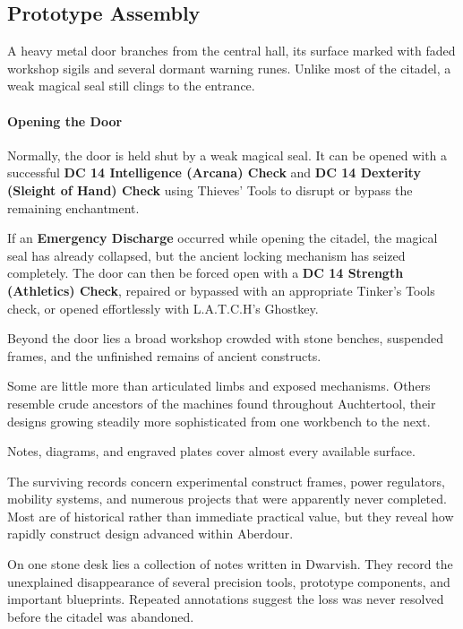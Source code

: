 \subsection*{ Prototype Assembly}
{\entryfont A heavy metal door branches from the central hall, its surface marked with faded workshop sigils and several dormant warning runes. Unlike most of the citadel, a weak magical seal still clings to the entrance.

\paragraph*{Opening the Door} Normally, the door is held shut by a weak magical seal. It can be opened with a successful \textbf{DC 14 Intelligence (Arcana) Check} and \textbf{DC 14 Dexterity (Sleight of Hand) Check} using Thieves' Tools to disrupt or bypass the remaining enchantment.

If an \textbf{Emergency Discharge} occurred while opening the citadel, the magical seal has already collapsed, but the ancient locking mechanism has seized completely. The door can then be forced open with a \textbf{DC 14 Strength (Athletics) Check}, repaired or bypassed with an appropriate Tinker's Tools check, or opened effortlessly with L.A.T.C.H's Ghostkey.}
\begin{DndReadAloud}
	Beyond the door lies a broad workshop crowded with stone benches, suspended frames, and the unfinished remains of ancient constructs.

Some are little more than articulated limbs and exposed mechanisms. Others resemble crude ancestors of the machines found throughout Auchtertool, their designs growing steadily more sophisticated from one workbench to the next.

Notes, diagrams, and engraved plates cover almost every available surface.
\end{DndReadAloud}
{\noindent\entryfont The surviving records concern experimental construct frames, power regulators, mobility systems, and numerous projects that were apparently never completed. Most are of historical rather than immediate practical value, but they reveal how rapidly construct design advanced within Aberdour.

On one stone desk lies a collection of notes written in Dwarvish. They record the unexplained disappearance of several precision tools, prototype components, and important blueprints. Repeated annotations suggest the loss was never resolved before the citadel was abandoned.}

